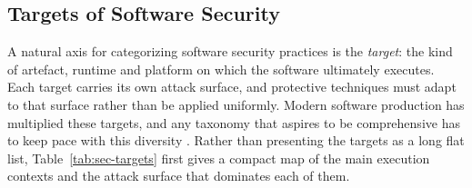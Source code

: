 \subsection{Targets of Software Security}
\label{subsec:targets}

A natural axis for categorizing software security practices is the
\emph{target}: the kind of artefact, runtime and platform on which the
software ultimately executes. Each target carries its own attack surface,
and protective techniques must adapt to that surface rather than be
applied uniformly. Modern software production has multiplied these
targets, and any taxonomy that aspires to be comprehensive has to keep
pace with this diversity \citep{placeholder-detection-survey}. Rather
than presenting the targets as a long flat list, Table~\ref{tab:sec-targets}
first gives a compact map of the main execution contexts and the attack
surface that dominates each of them.

